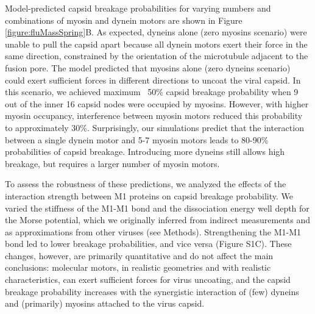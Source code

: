 Model-predicted capsid breakage probabilities for varying numbers and combinations of myosin and dynein motors are shown in Figure \ref{figure:fluMassSpring}B. As expected, dyneins alone (zero myosins scenario) were unable to pull the capsid apart because all dynein motors exert their force in the same direction, constrained by the orientation of the microtubule adjacent to the fusion pore. The model predicted that myosins alone (zero dyneins scenario) could exert sufficient forces in different directions to uncoat the viral capsid. In this scenario, we achieved maximum ~50\% capsid breakage probability when 9 out of the inner 16 capsid nodes were occupied by myosins. However, with higher myosin occupancy, interference between myosin motors reduced this probability to approximately 30\%. Surprisingly, our simulations predict that the interaction between a single dynein motor and 5-7 myosin motors leads to 80-90\% probabilities of capsid breakage. Introducing more dyneins still allows high breakage, but requires a larger number of myosin motors.

To assess the robustness of these predictions, we analyzed the effects of the interaction strength between M1 proteins on capsid breakage probability. We varied the stiffness of the M1-M1 bond and the dissociation energy well depth for the Morse potential, which we originally inferred from indirect measurements and as approximations from other viruses (see Methods). Strengthening the M1-M1 bond led to lower breakage probabilities, and vice versa (Figure S1C). These changes, however, are primarily quantitative and do not affect the main conclusions: molecular motors, in realistic geometries and with realistic characteristics, can exert sufficient forces for virus uncoating, and the capsid breakage probability increases with the synergistic interaction of (few) dyneins and (primarily) myosins attached to the virus capsid.